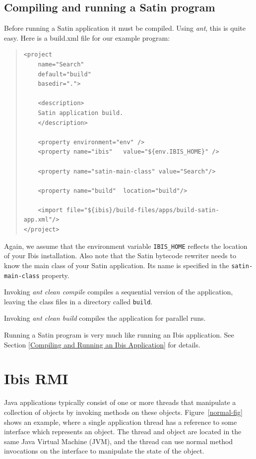 \documentclass[10pt]{article}
\newcommand{\mysection}[1]{\section{#1}\label{#1}}
\newcommand{\mysubsection}[1]{\subsection{#1}\label{#1}}
\begin{document}
\mysubsection{Compiling and running a Satin program}

Before running a Satin application it must be compiled.
Using \emph{ant}, this is quite easy. Here is a build.xml file for
our example program:

\begin{quote}
\begin{verbatim}
<project
    name="Search"
    default="build"
    basedir=".">

    <description>
    Satin application build.
    </description>

    <property environment="env" />
    <property name="ibis"   value="${env.IBIS_HOME}" />

    <property name="satin-main-class" value="Search"/>

    <property name="build"  location="build"/>

    <import file="${ibis}/build-files/apps/build-satin-app.xml"/>
</project>
\end{verbatim}
\end{quote}

Again, we assume that the environment variable \texttt{IBIS\_HOME} reflects
the location of your Ibis installation.
Also note that the Satin bytecode rewriter needs to know the main class of your
Satin application.
Its name is specified in the \texttt{satin-main-class} property.

Invoking \emph{ant clean compile} compiles a sequential version
of the application, 
leaving the class files in a directory called \texttt{build}.

Invoking \emph{ant clean build} compiles the application for parallel
runs.

Running a Satin program is very much like running an Ibis application.
See Section \ref{Compiling and Running an Ibis Application} for details.


\mysection{Ibis RMI}

Java applications typically consist of one or more threads that
manipulate a collection of objects by invoking methods on these
objects. Figure~\ref{normal-fig} shows an example, where a single application thread
has a reference to some interface which represents an object. The
thread and object are located in the same Java Virtual Machine (JVM),
and the thread can use normal method invocations on the interface to
manipulate the state of the object.
\end{document}
